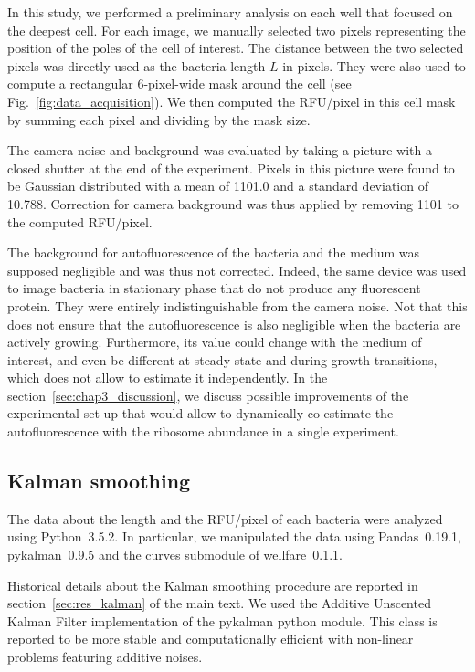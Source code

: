In this study, we performed a preliminary analysis on each well that focused on the deepest cell.
For each image, we manually selected two pixels representing the position of the poles of the cell of interest.
The distance between the two selected pixels was directly used as the bacteria length $L$ in pixels.
They were also used to compute a rectangular 6-pixel-wide mask around the cell (see Fig.~\ref{fig:data_acquisition}).
We then computed the RFU/pixel in this cell mask by summing each pixel and dividing by the mask size.

The camera noise and background was evaluated by taking a picture with a closed shutter at the end of the experiment.
Pixels in this picture were found to be Gaussian distributed with a mean of 1101.0 and a standard deviation of 10.788.
Correction for camera background was thus applied by removing 1101 to the computed RFU/pixel.

The background for autofluorescence of the bacteria and the medium was supposed negligible and was thus not corrected.
Indeed, the same device was used to image bacteria in stationary phase that do not produce any fluorescent protein.
They were entirely indistinguishable from the camera noise.
Not that this does not ensure that the autofluorescence is also negligible when the bacteria are actively growing.
Furthermore, its value could change with the medium of interest, and even be different at steady state and during growth transitions, which does not allow to estimate it independently.
In the section~\ref{sec:chap3_discussion}, we discuss possible improvements of the experimental set-up that would allow to dynamically co-estimate the autofluorescence with the ribosome abundance in a single experiment.

\subsection{Kalman smoothing}
\label{sec:meth_kalman}

The data about the length and the RFU/pixel of each bacteria were analyzed using Python~3.5.2.
In particular, we manipulated the data using Pandas~0.19.1, pykalman~0.9.5 and the curves submodule of wellfare~0.1.1.

Historical details about the Kalman smoothing procedure are reported in section~\ref{sec:res_kalman} of the main text.
We used the Additive Unscented Kalman Filter implementation of the pykalman python module.
This class is reported to be more stable and computationally efficient with non-linear problems featuring additive noises.

